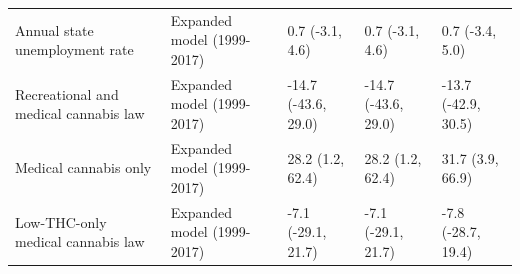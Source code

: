 \begin{table}
\begin{tabular}[t]{lllll}
Annual state unemployment rate & Expanded model (1999-2017) & 0.7 (-3.1, 4.6) & 0.7 (-3.1, 4.6) & 0.7 (-3.4, 5.0)\\
Recreational and medical cannabis law & Expanded model (1999-2017) & -14.7 (-43.6, 29.0) & -14.7 (-43.6, 29.0) & -13.7 (-42.9, 30.5)\\
\addlinespace
Medical cannabis only & Expanded model (1999-2017) & 28.2 (1.2, 62.4) & 28.2 (1.2, 62.4) & 31.7 (3.9, 66.9)\\
Low-THC-only medical cannabis law & Expanded model (1999-2017) & -7.1 (-29.1, 21.7) & -7.1 (-29.1, 21.7) & -7.8 (-28.7, 19.4)\\
\bottomrule
\end{tabular}
\end{table}
